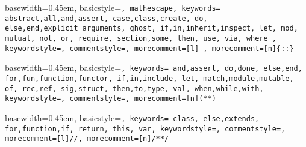 { basewidth=0.45em,
  basicstyle=\small\tt,  %
  mathescape,
  keywords={
    abstract,all,and,assert,
    case,class,create,
    do,
    else,end,explicit_arguments,
    ghost,
    if,in,inherit,inspect,
    let,
    mod,
    mutual,
    not,
    or,
    require,
    section,some,
    then,
    use,
    via,
    where
  },
  keywordstyle=\color{blue},
  commentstyle=\color{brown},
  morecomment=[l]{--},
  morecomment=[n]{\{:}{:\}}
}

 {\lstset{language=alba}} {}







{ basewidth=0.45em,
  basicstyle=\tt\small,
  keywords={
    and,assert,
    do,done,
    else,end,
    for,fun,function,functor,
    if,in,include,
    let,
    match,module,mutable,
    of,
    rec,ref,
    sig,struct,
    then,to,type,
    val,
    when,while,with},
  keywordstyle=\color{blue},
  commentstyle=\color{brown},
  morecomment=[n]{(*}{*)}
}

 {\lstset{language=ocaml}} {}





{ basewidth=0.45em,
  basicstyle=\small\tt,
  keywords={
    class,
    else,extends,
    for,function,if,
    return,
    this,
    var},
  keywordstyle=\color{blue},
  commentstyle=\color{brown},
  morecomment=[l]{//},
  morecomment=[n]{/*}{*/}
}

 {\lstset{language=js}} {}




\newcommand{\code}[1]{{\tt\small #1}}

\def\vec#1{\mathbf{#1}}

\def\Abold{\mathbf{A}}
\def\abold{\mathbf{a}}
\def\Bbold{\mathbf{B}}
\def\bbold{\mathbf{b}}
\def\Cbold{\mathbf{C}}
\def\Dbold{\mathbf{D}}
\def\fbold{\mathbf{f}}
\def\Pbold{\mathbf{P}}
\def\pbold{\mathbf{p}}
\def\qbold{\mathbf{q}}
\def\Tbold{\mathbf{T}}
\def\tbold{\mathbf{t}}
\def\xbold{\mathbf{x}}
\def\ybold{\mathbf{y}}
\def\zbold{\mathbf{z}}


\def\Abstract{{\cal{A}}}
\def\Any{{\cal{U}}}
\def\Boolean  {{\mathbb{B}}}
\def\Decision {{\mathbb{D}}}
\def\List   {{\mathbb{L}}}
\def\Natural{{\mathbb{N}}}
\def\Prop{{\cal{P}}}

